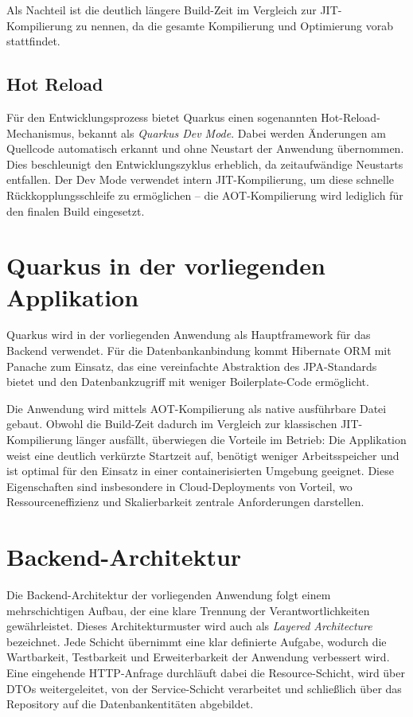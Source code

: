 Als Nachteil ist die deutlich längere Build-Zeit im Vergleich zur JIT-Kompilierung 
zu nennen, da die gesamte Kompilierung und Optimierung vorab stattfindet.

\subsection{Hot Reload}

Für den Entwicklungsprozess bietet Quarkus einen sogenannten Hot-Reload-Mechanismus, 
bekannt als \textit{Quarkus Dev Mode}. Dabei werden Änderungen am Quellcode automatisch 
erkannt und ohne Neustart der Anwendung übernommen. Dies beschleunigt den 
Entwicklungszyklus erheblich, da zeitaufwändige Neustarts entfallen. Der Dev Mode 
verwendet intern JIT-Kompilierung, um diese schnelle Rückkopplungsschleife zu 
ermöglichen – die AOT-Kompilierung wird lediglich für den finalen Build eingesetzt.


\section{Quarkus in der vorliegenden Applikation}

Quarkus wird in der vorliegenden Anwendung als Hauptframework für das Backend verwendet. 
Für die Datenbankanbindung kommt Hibernate ORM mit Panache zum Einsatz, das eine 
vereinfachte Abstraktion des JPA-Standards bietet und den Datenbankzugriff mit weniger 
Boilerplate-Code ermöglicht.

Die Anwendung wird mittels AOT-Kompilierung als native ausführbare Datei gebaut. 
Obwohl die Build-Zeit dadurch im Vergleich zur klassischen JIT-Kompilierung länger 
ausfällt, überwiegen die Vorteile im Betrieb: Die Applikation weist eine deutlich 
verkürzte Startzeit auf, benötigt weniger Arbeitsspeicher und ist optimal für den 
Einsatz in einer containerisierten Umgebung geeignet. Diese Eigenschaften sind 
insbesondere in Cloud-Deployments von Vorteil, wo Ressourceneffizienz und 
Skalierbarkeit zentrale Anforderungen darstellen.
\section{Backend-Architektur}

Die Backend-Architektur der vorliegenden Anwendung folgt einem mehrschichtigen Aufbau,
der eine klare Trennung der Verantwortlichkeiten gewährleistet. Dieses Architekturmuster
wird auch als \textit{Layered Architecture} bezeichnet. Jede Schicht übernimmt eine
klar definierte Aufgabe, wodurch die Wartbarkeit, Testbarkeit und Erweiterbarkeit
der Anwendung verbessert wird. Eine eingehende HTTP-Anfrage durchläuft dabei die
Resource-Schicht, wird über DTOs weitergeleitet, von der Service-Schicht verarbeitet
und schließlich über das Repository auf die Datenbankentitäten abgebildet.

